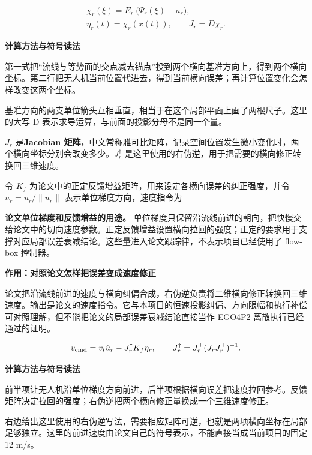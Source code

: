 \documentclass[12pt,a4paper]{article}
\numberwithin{equation}{topic}
\begin{document}
\begin{equation}
\label{eq:flow-box}
\begin{gathered}
\chi_r(\xi)=E_r^\top\bigl(\Psi_r(\xi)-a_r\bigr),\qquad\\
\eta_r(t)=\chi_r(x(t)),\qquad J_r=D\chi_r.
\end{gathered}
\end{equation}

\noindent\textbf{计算方法与符号读法}\par\nobreak
第一式把“流线与等势面的交点减去锚点”投到两个横向基准方向上，得到两个横向坐标。第二行把无人机当前位置代进去，得到当前横向误差；再计算位置变化会怎样改变这两个坐标。

基准方向的两支单位箭头互相垂直，相当于在这个局部平面上画了两根尺子。这里的大写 D 表示求导运算，与前面的投影分母不是同一个量。


\(J_r\) 是\textbf{Jacobian 矩阵}，中文常称雅可比矩阵，记录空间位置发生微小变化时，两个横向坐标分别会改变多少。\(J_r^\dagger\) 是这里使用的右伪逆，用于把需要的横向修正转换回三维速度。

令 \(K_f\) 为论文中的正定反馈增益矩阵，用来设定各横向误差的纠正强度，并令 \(\hat u_r=u_r/\|u_r\|\) 表示单位梯度方向，速度指令为

\textbf{论文单位梯度和反馈增益的用途。} 单位梯度只保留沿流线前进的朝向，把快慢交给论文中的切向速度参数。正定反馈增益设置横向拉回的强度；正定的要求用于支撑对应局部误差衰减结论。这些量进入论文跟踪律，不表示项目已经使用了 flow-box 控制器。

\noindent\textbf{作用：对照论文怎样把误差变成速度修正}\par\nobreak
论文把沿流线前进的速度与横向纠偏合成，右伪逆负责将二维横向修正转换回三维速度。输出是论文的速度指令。它与本项目的恒速投影纠偏、方向限幅和执行补偿可对照理解，但不能把论文的局部误差衰减结论直接当作 EGO4P2 离散执行已经通过的证明。

\begin{equation}
\label{eq:flare-feedback}
v_{\rm cmd}=v_t\hat u_r-J_r^\dagger K_f\eta_r,\qquad
J_r^\dagger=J_r^\top(J_rJ_r^\top)^{-1}.
\end{equation}

\noindent\textbf{计算方法与符号读法}\par\nobreak
前半项让无人机沿单位梯度方向前进，后半项根据横向误差把速度拉回参考。反馈矩阵决定拉回的强度；右伪逆把两个横向修正量换成一个三维速度修正。

右边给出这里使用的右伪逆写法，需要相应矩阵可逆，也就是两项横向坐标在局部足够独立。这里的前进速度由论文自己的符号表示，不能直接当成当前项目的固定 12 m/s。
\end{document}
